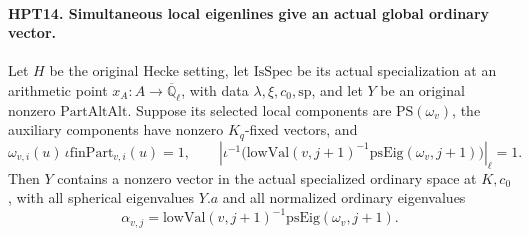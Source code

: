 \documentclass[11pt,a4paper]{article}
\numberwithin{equation}{section}
\theoremstyle{remark}\newtheorem{remark}[theorem]{Remark}
\begin{document}
\paragraph{HPT14. Simultaneous local eigenlines give an actual global ordinary vector.}
\label{claim:HPT14}
Let $H$ be the original Hecke setting, let $\mathrm{IsSpec}$ be
its actual specialization at an arithmetic point $x_A:A\to
\overline{\mathbb Q}_\ell$, with data $\lambda,\xi,c_0,\mathrm{sp}$,
and let $Y$ be an original nonzero $\mathrm{PartAltAlt}$.
Suppose its selected local components are $\mathrm{PS}(\omega_v)$,
the auxiliary components have nonzero $K_q$-fixed vectors, and
\[
 \omega_{v,i}(u)\,\iota\mathrm{finPart}_{v,i}(u)=1,\qquad
 \left|\iota^{-1}\bigl(\mathrm{lowVal}(v,j+1)^{-1}
                 \mathrm{psEig}(\omega_v,j+1)\bigr)\right|_\ell=1.
                                                               \tag{HPT.12}
\]
Then $Y$ contains a nonzero vector in the actual specialized
ordinary space at $K,c_0$, with all spherical eigenvalues $Y.a$
and all normalized ordinary eigenvalues
\[
             \alpha_{v,j}=\mathrm{lowVal}(v,j+1)^{-1}
                                     \mathrm{psEig}(\omega_v,j+1).
                                                               \tag{HPT.13}
\]
\end{document}
